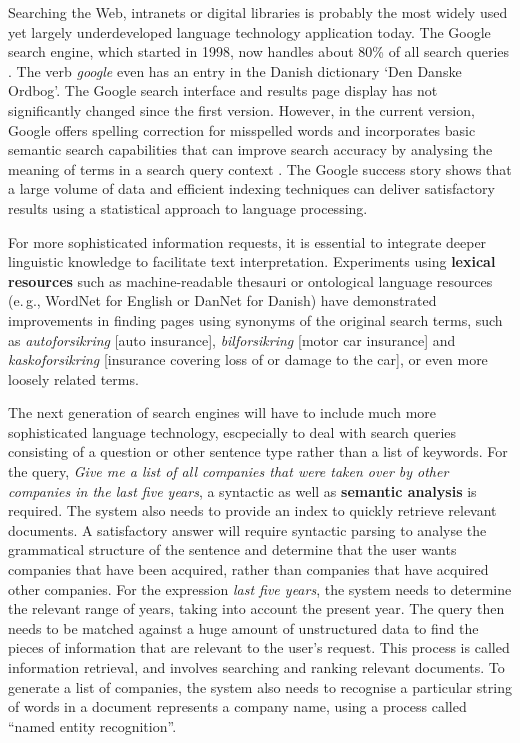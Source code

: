 \documentclass[]{../../metanetpaper}
\begin{document}
\begin{multicols}{2}
Searching the Web, intranets or digital libraries is probably the most widely used yet largely underdeveloped language technology application today. The Google search engine, which started in 1998, now handles about 80\% of all search queries \cite{spi1}. The verb {\it google} even has an entry in the Danish dictionary `Den Danske Ordbog'. The Google search interface and results page display has not significantly changed since the first version. However, in the current version, Google offers spelling correction for misspelled words and incorporates basic semantic search capabilities that can improve search accuracy by analysing the meaning of terms in a search query context \cite{pc1}. The Google success story shows that a large volume of data and efficient indexing techniques can deliver satisfactory results using a statistical approach to language processing. 

For more sophisticated information requests, it is essential to integrate deeper linguistic knowledge to facilitate text interpretation. Experiments using \textbf{lexical resources} such as machine-readable thesauri or ontological language resources (e.\,g., WordNet for English or DanNet for Danish) have demonstrated improvements in finding pages using synonyms of the original search terms, such as \textit{autoforsikring} {[}auto insurance{]}, \textit{bilforsikring} {[}motor car insurance{]} and \textit{kaskoforsikring} {[}insurance covering loss of or damage to the car{]}, or even more loosely related terms.


The next generation of search engines will have to include much more sophisticated language technology, escpecially to deal with search queries consisting of a question or other sentence type rather than a list of keywords. For the query, \textit{Give me a list of all companies that were taken over by other companies in the last five years}, a syntactic as well as \textbf{semantic analysis} is required. The system also needs to provide an index to quickly retrieve relevant documents. A satisfactory answer will require syntactic parsing to analyse the grammatical structure of the sentence and determine that the user wants companies that have been acquired, rather than companies that have acquired other companies. For the expression \textit{last five years}, the system needs to determine the relevant range of years, taking into account the present year. The query then needs to be matched against a huge amount of unstructured data to find the pieces of information that are relevant to the user’s request. This process is called information retrieval, and involves searching and ranking relevant documents. To generate a list of companies, the system also needs to recognise a particular string of words in a document represents a company name, using a process called ``named entity recognition''.


\end{multicols}
\end{document}
